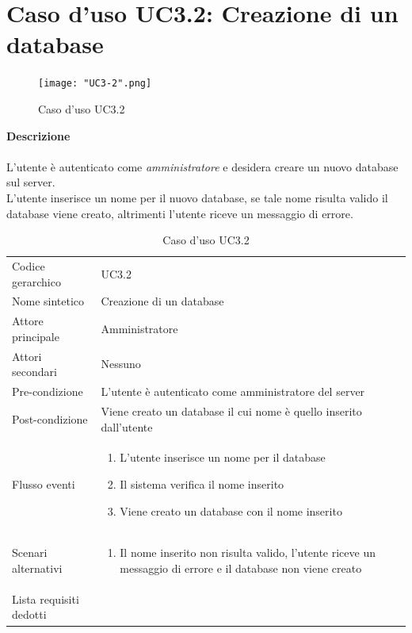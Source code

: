 \documentclass[a4paper]{report}
\begin{document}
	 \section{Caso d'uso UC3.2: Creazione di un database}
	 	\begin{figure}[H]
			\centering
			\texttt{[image: "UC3-2".png]}
			\caption{Caso d'uso UC3.2}
		\end{figure}
	 \textbf{Descrizione} \\ \\
	 L'utente è autenticato come \emph{amministratore} e desidera creare un nuovo database sul server. 
	 \\ L'utente inserisce un nome per il nuovo database, se tale nome risulta valido il database viene
	  creato, altrimenti l'utente riceve un messaggio di errore. \\
		\begin{table}[H]
		\begin{tabularx}{\textwidth}{X | X}\toprule
			\rowcolor{orange!65}Codice gerarchico & UC3.2 \\
			Nome sintetico & Creazione di un database \\
			\rowcolor{orange!65}Attore principale & Amministratore\\
			Attori secondari & Nessuno \\
			\rowcolor{orange!65}Pre-condizione & L'utente è autenticato come amministratore del server\\
			Post-condizione & Viene creato un database il cui nome è quello inserito dall'utente \\
			\rowcolor{orange!65}Flusso eventi & \begin{enumerate}
			\item L'utente inserisce un nome per il database
			\item Il sistema verifica il nome inserito
			\item Viene creato un database con il nome inserito
			\end{enumerate} \\
			Scenari alternativi & \begin{enumerate}
			\item Il nome inserito non risulta valido, l'utente riceve un messaggio di errore e il database non
			 viene creato
			\end{enumerate} \\
			\rowcolor{orange!65}Lista requisiti dedotti & \\
			\bottomrule
		\end{tabularx}
		\caption{Caso d'uso UC3.2}
	 \end{table}
\end{document}
